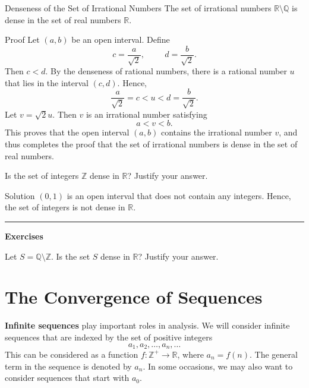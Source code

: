 \begin{theorem}{Denseness of the Set of Irrational Numbers}
The set of irrational numbers $\mathbb{R}\setminus\mathbb{Q}$ is dense in the set of real numbers $\mathbb{R}$.

\end{theorem}
\begin{myproof}{Proof}
Let $(a, b)$ be an open interval.  Define
\[c=\frac{a}{\sqrt{2}}, \hspace{1cm}d=\frac{b}{\sqrt{2}}.\]
Then $c<d$. By the denseness of rational numbers, there is a rational number $u$ that lies in the interval $(c,d)$. Hence, 
\[\frac{a}{\sqrt{2}}=c<u<d=\frac{b}{\sqrt{2}}.\]
Let $v=\sqrt{2}u$. Then $v$ is an irrational number satisfying
\[a<v<b.\]
This proves that the open interval $(a, b)$ contains the irrational number $v$, and thus completes the proof that the set of irrational numbers is dense in the set of real numbers.
\end{myproof}

 
\begin{example}{}
Is the set of integers $\mathbb{Z}$ dense in $\mathbb{R}$? Justify your answer.
\end{example}
\begin{solution}{Solution}
$(0,1)$ is an open interval that does not contain any integers. Hence, the set of integers is not dense in $\mathbb{R}$.
\end{solution}
\vspace{0.8cm}
\hrule
\vspace{0.8cm}
\noindent
{\bf \large Exercises  \thesection}
\setcounter{myquestion}{1}


 \begin{question}{\themyquestion}
Let  $S=\mathbb{Q}\setminus\mathbb{Z}$. Is the set $S$ dense in $\mathbb{R}$? Justify your answer.
\end{question}

\vp
\section{The Convergence of Sequences}\label{sec1.5}

{\bf Infinite sequences} play important roles in analysis. We will consider infinite sequences that are indexed by the set of positive integers
\[a_1, a_2, \ldots, a_n, \ldots\]
This can be considered as a function $f:\mathbb{Z}^+\rightarrow\mathbb{R}$, where $a_n=f(n)$.  The general term in the sequence is denoted by $a_n$.  In some occasions, we may also want to consider sequences that start with $a_0$.

